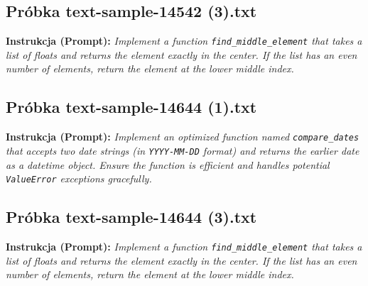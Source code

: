 


\subsection{Próbka text-sample-14542 (3).txt}
\label{sec:lst:text-sample-14542-3}
\textbf{Instrukcja (Prompt):} \textit{Implement a function \texttt{find\_middle\_element} that takes a list of floats and returns the element exactly in the center. If the list has an even number of elements, return the element at the lower middle index.}




\subsection{Próbka text-sample-14644 (1).txt}
\label{sec:lst:text-sample-14644-1}
\textbf{Instrukcja (Prompt):} \textit{Implement an optimized function named \texttt{compare\_dates} that accepts two date strings (in \texttt{YYYY-MM-DD} format) and returns the earlier date as a datetime object. Ensure the function is efficient and handles potential \texttt{ValueError} exceptions gracefully.}




\subsection{Próbka text-sample-14644 (3).txt}
\label{sec:lst:text-sample-14644-3}
\textbf{Instrukcja (Prompt):} \textit{Implement a function \texttt{find\_middle\_element} that takes a list of floats and returns the element exactly in the center. If the list has an even number of elements, return the element at the lower middle index.}




